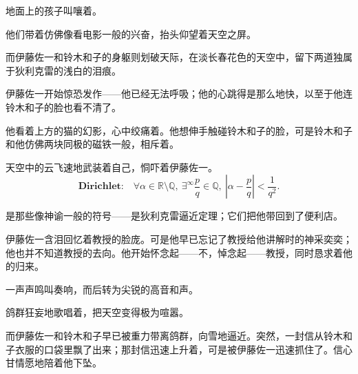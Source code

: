 
\AddSymbolsG
\pagecolor{Sepia!20!Orange!20!Gray}
\color{white}
\quad\quad \lettrine[,lraise=0.2,lhang=0.5]{\textbf{}}{}地面上的孩子叫嚷着。

他们带着仿佛像看电影一般的兴奋，抬头仰望着天空之屏。

而伊藤佐一和铃木和子的身躯则划破天际，在淡长春花色的天空中，留下两道独属于狄利克雷的浅白的泪痕。

伊藤佐一开始惊恐发作——他已经无法呼吸；他的心跳得是那么地快，以至于他连铃木和子的脸也看不清了。


他看着上方的猫的幻影，心中绞痛着。他想伸手触碰铃木和子的脸，可是铃木和子和他仿佛两块同极的磁铁一般，相斥着。

天空中的云飞速地武装着自己，恫吓着伊藤佐一。
\begin{equation*}
    \textbf{Dirichlet:} \quad \forall \alpha \in \mathbb{R} \setminus \mathbb{Q},\ \exists^\infty \frac{p}{q} \in \mathbb{Q},\ \left| \alpha - \frac{p}{q} \right| < \frac{1}{q^2}.
\end{equation*}

是那些像神谕一般的符号——是狄利克雷逼近定理；它们把他带回到了便利店。

伊藤佐一含泪回忆着教授的脸庞。可是他早已忘记了教授给他讲解时的神采奕奕；他也并不知道教授的去向。他开始怀念起——不，悼念起——教授，同时恳求着他的归来。

一声声鸣叫奏响，而后转为尖锐的高音和声。

\begin{center}
\end{center}

鸽群狂妄地歌唱着，把天空变得极为喧嚣。

而伊藤佐一和铃木和子早已被重力带离鸽群，向雪地逼近。突然，一封信从铃木和子衣服的口袋里飘了出来；那封信迅速上升着，可是被伊藤佐一迅速抓住了。信心甘情愿地陪着他下坠。

